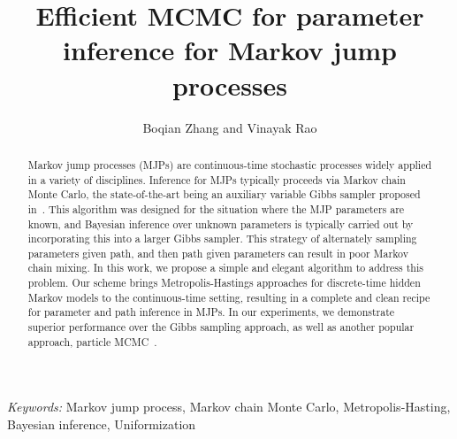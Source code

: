 \documentclass{statsoc}
\title[Efficient MCMC for parameter inference for MJPs]{\bf Efficient MCMC for parameter inference for Markov jump processes}
\author{Boqian Zhang and Vinayak Rao}
\begin{document}
\def\spacingset#1{\renewcommand{\baselinestretch}
{#1}\small\normalsize} \spacingset{1}



\begin{abstract}
Markov jump processes (MJPs) are continuous-time stochastic processes 
widely applied in a variety of disciplines. Inference for MJPs typically
proceeds via Markov chain Monte Carlo, the state-of-the-art being an auxiliary
variable Gibbs sampler proposed in~\cite{RaoTeh13}. This algorithm was
designed for the situation where the MJP parameters are known, and Bayesian
inference over unknown parameters is typically carried out by incorporating
this into a larger Gibbs sampler.
This strategy of alternately sampling parameters given path, and
then path given parameters can result in poor Markov chain mixing. In this
work, we propose a simple and elegant algorithm to address this
problem. Our scheme brings Metropolis-Hastings approaches
for discrete-time hidden Markov models to the continuous-time
setting, %
resulting in %
 a complete and clean recipe for
parameter and path inference in MJPs. In our experiments, we
demonstrate superior performance over the Gibbs sampling approach, as well as
another popular approach, particle MCMC~\cite{Andrieu10}.
\end{abstract}
\noindent%
{\it Keywords:}  Markov jump process, Markov chain Monte Carlo, Metropolis-Hasting, Bayesian
inference, Uniformization
\vspace{-.05in}






%







%
\end{document}
